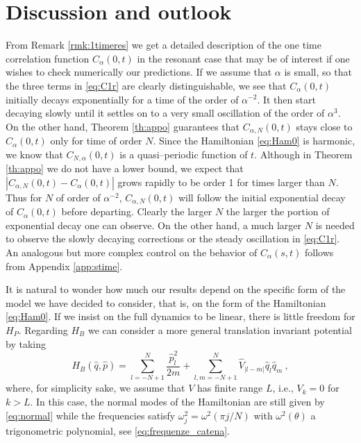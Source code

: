 \documentclass[11pt]{article}
\numberwithin{equation}{section}
\def\red{\textcolor{red}}
\def\red{}
\numberwithin{theorem}{section}
\begin{document}
\section{Discussion and outlook}
\label{sec:discussion}

\red {From Remark \ref{rmk:1timeres} we get a detailed description of the one time correlation function $C_{\alpha}(0,t)$
in the resonant case that may be of interest if one wishes to check numerically our predictions. If we assume that
$\alpha$ is small, so that the three terms in \eqref{eq:C1r} are clearly distinguishable, we see that
$C_{\alpha}(0,t)$ initially decays exponentially for a time of the order of $\alpha^{-2}$. It then start decaying
slowly until it settles on to a very small oscillation of the order of $\alpha^3$. On the other hand, Theorem
\ref{th:appo} guarantees that $C_{\alpha,N}(0,t)$ stays close to $C_{\alpha}(0,t)$ only for time of order $N$.
Since the Hamiltonian \eqref{eq:Ham0} is harmonic, we know that $C_{N,\alpha}(0,t)$ is a quasi--periodic function
of $t$. Although in Theorem \ref{th:appo} we do not have a lower bound, we expect that
$|C_{\alpha,N}(0,t)-C_{\alpha}(0,t)|$ grows rapidly to be order 1 for times larger than $N$. Thus for $N$ of order
of $\alpha^{-2}$, $C_{\alpha,N}(0,t)$ will follow the initial exponential decay of $C_{\alpha}(0,t)$ before
departing. Clearly the larger $N$ the larger the portion of exponential decay one can observe. On the other hand, a
much larger $N$ is needed to observe the slowly decaying corrections or the steady oscillation in \eqref{eq:C1r}.
An analogous but more complex control on the behavior of $C_{\alpha}(s,t)$ follows from Appendix \ref{app:stime}.}

\medskip

It is natural to wonder how much our results depend on the specific form of the model we have decided to consider, that
is, on the form of the Hamiltonian \eqref{eq:Ham0}. If we insist on the full dynamics to be linear, there is little
freedom for $H_P$. Regarding $H_B$ we can consider a more general translation invariant potential by taking
\[
 H_B(\hat q,\hat p)=\sum_{l=-N+1}^{N} \frac{\hat
  p_l^2}{2m}+\sum_{l,m=-N+1}^{N} \hat V_{|l-m|} \hat q_l\hat q_m\ ,
\]
where, for simplicity sake, we assume that $V$ has finite range $L$, i.e., $V_k=0$ for $k>L$. In
this case, the normal modes of the Hamiltonian are still given by \eqref{eq:normal} while the
frequencies satisfy $\omega^2_j=\omega^2(\pi j/N)$ with $\omega^2(\theta)$ a trigonometric polynomial, see 
\eqref{eq:frequenze_catena}.
\end{document}
